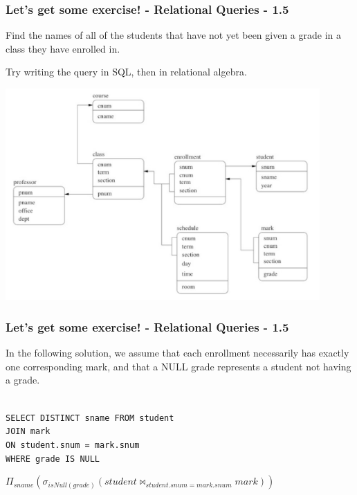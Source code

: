 \begin{frame}
\frametitle{Let's get some exercise! - Relational Queries - 1.5}

Find the names of all of the students that have not yet been given a grade in a class they have enrolled in.

Try writing the query in SQL, then in relational algebra.

\begin{center}
  \includegraphics[width=0.9\textwidth]{images/db-schema.png}
\end{center}

\end{frame}


\begin{frame}
\frametitle{Let's get some exercise! - Relational Queries - 1.5}

In the following solution, we assume that each enrollment necessarily has exactly one corresponding mark, and that a NULL grade represents a student not having a grade.

\texttt{ \\
SELECT DISTINCT sname FROM student \\
JOIN mark \\
ON student.snum = mark.snum \\
WHERE grade IS NULL
}

$\Pi_{sname}(\sigma_{isNull(grade)}(student \bowtie_{student.snum=mark.snum} mark))$

\end{frame}



